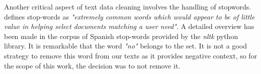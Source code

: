 
 Another critical aspect of text data cleaning involves the handling of stopwords. \cite{manning-2008} defines stop-words as \textit{"extremely common words which would appear to be of little value in helping select documents matching a user need"}.
A detailed overview has been made in the corpus of Spanish stop-words provided by the \textit{nltk} python library. It is remarkable that the word \textit{"no"} belongs to the set. It is not a good strategy to remove this word from our texts as it provides negative context, so for the scope of this work, the decision was to not remove it.
